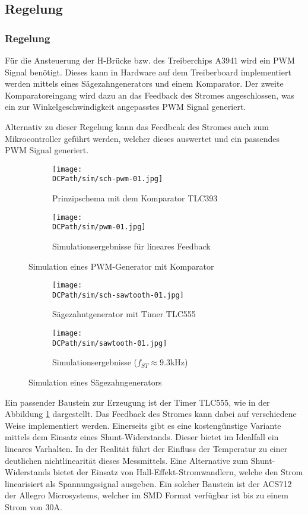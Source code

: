 \ifSTANDALONE
\subsection{Regelung}
\fi
\ifEMBED
\subsubsection{Regelung}
\fi
Für die Ansteuerung der H-Brücke bzw. des Treiberchips A3941 wird ein PWM
Signal benötigt. Dieses kann in Hardware auf dem Treiberboard implementiert
werden mittels eines Sägezahngenerators und einem Komparator. Der zweite
Komparatoreingang wird dazu an das Feedback des Stromes angeschlossen, was
ein zur Winkelgeschwindigkeit angepasstes PWM Signal generiert.

Alternativ zu dieser Regelung kann das Feedbcak des Stromes auch zum
Mikrocontroller geführt werden, welcher dieses auswertet und ein passendes
PWM Signal generiert.

\begin{figure}[h!]
    \centering
    \begin{subfigure}[b]{0.45\textwidth}
        \texttt{[image: \\DCPath/sim/sch-pwm-01.jpg]}
        \caption{Prinzipschema mit dem Komparator TLC393}
    \end{subfigure}
    \begin{subfigure}[b]{0.45\textwidth}
        \texttt{[image: \\DCPath/sim/pwm-01.jpg]}
        \caption{Simulationsergebnisse für lineares Feedback}
    \end{subfigure}
    \caption{Simulation eines PWM-Generator mit Komparator}
\end{figure}

\begin{figure}[h!]
    \centering
    \begin{subfigure}[b]{0.45\textwidth}
        \texttt{[image: \\DCPath/sim/sch-sawtooth-01.jpg]}
        \caption{Sägezahntgenerator mit Timer TLC555}
    \end{subfigure}
    \begin{subfigure}[b]{0.45\textwidth}
        \texttt{[image: \\DCPath/sim/sawtooth-01.jpg]}
        \caption{Simulationsergebnisse ($f_{ST} \approx 9.3$kHz)}
    \end{subfigure}
    \caption{Simulation eines Sägezahngenerators}
    \label{fig:sawtooth}
\end{figure}

Ein passender Baustein zur Erzeugung ist der Timer TLC555, wie in der
Abbildung \ref{fig:sawtooth} dargestellt. Das Feedback des Stromes kann
dabei auf verschiedene Weise implementiert werden. Einerseits gibt es eine
kostengünstige Variante mittels dem Einsatz eines Shunt-Widerstands. Dieser
bietet im Idealfall ein lineares Varhalten. In der Realität führt der
Einfluss der Temperatur zu einer deutlichen nichtlinearität dieses
Messmittels. Eine Alternative zum Shunt-Widerstands bietet der Einsatz von
Hall-Effekt-Stromwandlern, welche den Strom linearisiert als Spannungssignal
ausgeben. Ein solcher Baustein ist der ACS712 der Allegro Microsystems,
welcher im SMD Format verfügbar ist bis zu einem Strom von 30A.

